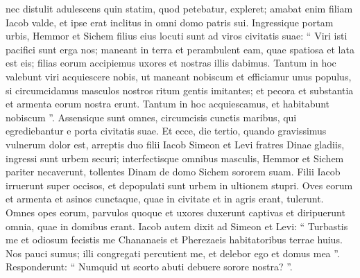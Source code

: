 \begin{biblechapter}
\begin{biblechapter}
\begin{biblechapter}
\begin{biblechapter}
\begin{biblechapter}
\begin{biblechapter}
\begin{biblechapter}
\begin{biblechapter}
\begin{biblechapter}
\begin{biblechapter}
\begin{biblechapter}
\begin{biblechapter}
\begin{biblechapter}
\begin{biblechapter}
\begin{biblechapter}
\begin{biblechapter}
\begin{biblechapter}
\begin{biblechapter}
\begin{biblechapter}
\begin{biblechapter}
\begin{biblechapter}
\begin{biblechapter}
\begin{biblechapter}
\begin{biblechapter}
\begin{biblechapter}
\begin{biblechapter}
\begin{biblechapter}
\begin{biblechapter}
\begin{biblechapter}
\begin{biblechapter}
\begin{biblechapter}
\begin{biblechapter}
\begin{biblechapter}
\begin{biblechapter}
\verse nec distulit adulescens quin statim, quod petebatur, expleret; amabat enim filiam Iacob valde, et ipse erat inclitus in omni domo patris sui.
 \verse Ingressique portam urbis, Hemmor et Sichem filius eius locuti sunt ad viros civitatis suae: 
\verse “ Viri isti pacifici sunt erga nos; maneant in terra et perambulent eam, quae spatiosa et lata est eis; filias eorum accipiemus uxores et nostras illis dabimus. 
\verse Tantum in hoc valebunt viri acquiescere nobis, ut maneant nobiscum et efficiamur unus populus, si circumcidamus masculos nostros ritum gentis imitantes; 
\verse et pecora et substantia et armenta eorum nostra erunt. Tantum in hoc acquiescamus, et habitabunt nobiscum ”.
 \verse Assensique sunt omnes, circumcisis cunctis maribus, qui egrediebantur e porta civitatis suae.
 \verse Et ecce, die tertio, quando gravissimus vulnerum dolor est, arreptis duo filii Iacob Simeon et Levi fratres Dinae gladiis, ingressi sunt urbem securi; interfectisque omnibus masculis, 
\verse Hemmor et Sichem pariter necaverunt, tollentes Dinam de domo Sichem sororem suam. 
\verse Filii Iacob irruerunt super occisos, et depopulati sunt urbem in ultionem stupri. 
\verse Oves eorum et armenta et asinos cunctaque, quae in civitate et in agris erant, tulerunt. 
 \verse Omnes opes eorum, parvulos quoque et uxores duxerunt captivas et diripuerunt omnia, quae in domibus erant. 
\verse Iacob autem dixit ad Simeon et Levi: “ Turbastis me et odiosum fecistis me Chananaeis et Pherezaeis habitatoribus terrae huius. Nos pauci sumus; illi congregati percutient me, et delebor ego et domus mea ”. 
\verse Responderunt: “ Numquid ut scorto abuti debuere sorore nostra? ”.
 

\end{biblechapter}
\end{biblechapter}
\end{biblechapter}
\end{biblechapter}
\end{biblechapter}
\end{biblechapter}
\end{biblechapter}
\end{biblechapter}
\end{biblechapter}
\end{biblechapter}
\end{biblechapter}
\end{biblechapter}
\end{biblechapter}
\end{biblechapter}
\end{biblechapter}
\end{biblechapter}
\end{biblechapter}
\end{biblechapter}
\end{biblechapter}
\end{biblechapter}
\end{biblechapter}
\end{biblechapter}
\end{biblechapter}
\end{biblechapter}
\end{biblechapter}
\end{biblechapter}
\end{biblechapter}
\end{biblechapter}
\end{biblechapter}
\end{biblechapter}
\end{biblechapter}
\end{biblechapter}
\end{biblechapter}
\end{biblechapter}
